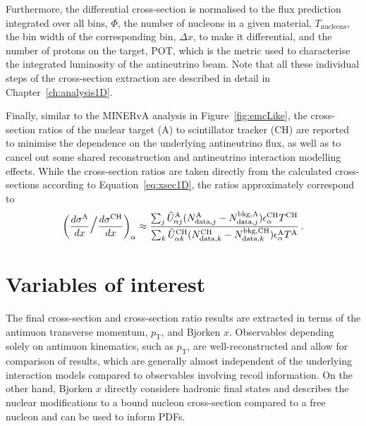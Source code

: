 Furthermore, the differential cross-section is normalised to the flux prediction integrated over all bins, $\Phi$, the number of nucleons in a given material, $T_{\text{nucleons}}$, the bin width of the corresponding bin, $\Delta x$, to make it differential, and the number of protons on the target, POT, which is the metric used to characterise the integrated luminosity of the antineutrino beam. Note that all these individual steps of the cross-section extraction are described in detail in Chapter~\ref{ch:analysis1D}.

Finally, similar to the MINERvA analysis in Figure~\ref{fig:emcLike}, the cross-section ratios of the nuclear target (A) to scintillator tracker (CH) are reported to minimise the dependence on the underlying antineutrino flux, as well as to cancel out some shared reconstruction and antineutrino interaction modelling effects. While the cross-section ratios are taken directly from the calculated cross-sections according to Equation~\ref{eq:xsec1D}, the ratios approximately correspond to
\vspace{-5pt}
\begin{equation}
    \left( \frac{d\sigma^\text{A}}{dx} \mathlarger{\mathlarger{\mathlarger{/}}} \frac{d\sigma^{\text{CH}}}{dx} \right)_{\alpha} \approx \frac{\sum_j \tilde{U}_{\alpha j}^\text{A}(N_{\text{data}, j}^\text{A}- N_{\text{data},j}^{\text{bkg},\text{A}})\epsilon_{\alpha}^{\text{CH}}T^{\text{CH}}}{\sum_k \tilde{U}_{\alpha k}^{\text{CH}}(N_{\text{data}, k}^{\text{CH}}- N_{\text{data},k}^{\text{bkg},\text{CH}})\epsilon_{\alpha}^{\text{A}} T^{\text{A}}} \hspace{2pt}.
    \label{xsecs_ratios}
\end{equation}

\section{Variables of interest}\label{sec:variables}

The final cross-section and cross-section ratio results are extracted in terms of the antimuon transverse momentum, $p_{\text{T}}$, and Bjorken $x$. Observables depending solely on antimuon kinematics, such as $p_{\text{T}}$, are well-reconstructed and allow for comparison of results, which are generally almost independent of the underlying interaction models compared to observables involving recoil information. On the other hand, Bjorken $x$ directly considers hadronic final states and describes the nuclear modifications to a bound nucleon cross-section compared to a free nucleon and can be used to inform PDFs.


